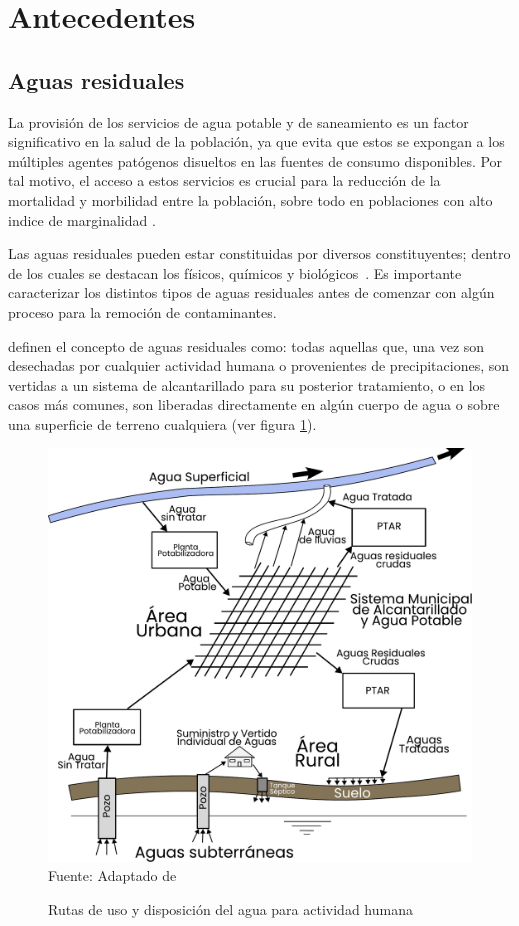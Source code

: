 \section{Antecedentes}
\subsection{Aguas residuales}
La provisión de los servicios de agua potable y de saneamiento es un factor significativo en la salud de la población, ya que evita que estos se expongan a los múltiples agentes patógenos disueltos en las fuentes de consumo disponibles. Por tal motivo, el acceso a estos servicios es crucial para la reducción de la mortalidad y morbilidad entre la población, sobre todo en poblaciones con alto indice de marginalidad \citep{EAM}.\par
Las aguas residuales pueden estar constituidas por diversos constituyentes; dentro de los cuales se destacan los físicos, químicos y biológicos~\citep{crites2000}. Es importante caracterizar los distintos tipos de aguas residuales antes de comenzar con algún proceso para la remoción de contaminantes.\par
\cite{metcalf2003} definen el concepto de aguas residuales como: todas aquellas que, una vez son desechadas por cualquier actividad humana o provenientes de precipitaciones, son vertidas a un sistema de alcantarillado para su posterior tratamiento, o en los casos más comunes, son liberadas directamente en algún cuerpo de agua o sobre una superficie de terreno cualquiera (ver figura \ref{fig:wrts}).\sloppy\par
\begin{figure}[ht]
	\centering
	\includegraphics[scale=0.4]{../Images/Water_routes.pdf}
	\\\small{Fuente: Adaptado de \cite{Sperling2007}}
	\caption{Rutas de uso y disposición del agua para actividad humana}\label{fig:wrts}
\end{figure}
